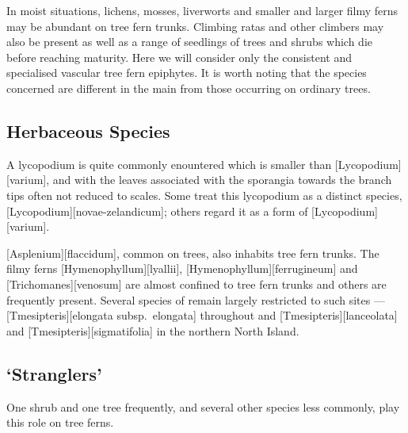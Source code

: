 In moist situations, lichens, mosses, liverworts and smaller and larger filmy ferns may be abundant on tree fern trunks.
Climbing ratas and other climbers may also be present as well as a range of seedlings of trees and shrubs which die before reaching maturity.
Here we will consider only the consistent and specialised vascular tree fern epiphytes.
It is worth noting that the species concerned are different in the main from those occurring on ordinary trees.

\subsection{Herbaceous Species}

A lycopodium is quite commonly enountered which is smaller than [Lycopodium][varium], and with the leaves associated with the sporangia towards the branch tips often not reduced to scales.
Some treat this lycopodium as a distinct species, [Lycopodium][novae-zelandicum]; others regard it as a form of [Lycopodium][varium].

[Asplenium][flaccidum], common on trees, also inhabits tree fern trunks.
The filmy ferns [Hymenophyllum][lyallii], [Hymenophyllum][ferrugineum] and [Trichomanes][venosum] are almost confined to tree fern trunks and others are frequently present.
Several species of  remain largely restricted to such sites --- [Tmesipteris][elongata subsp.\ elongata] throughout and [Tmesipteris][lanceolata] and [Tmesipteris][sigmatifolia] in the northern North Island.

\subsection{`Stranglers'}

One shrub and one tree frequently, and several other species less commonly, play this role on tree ferns.

